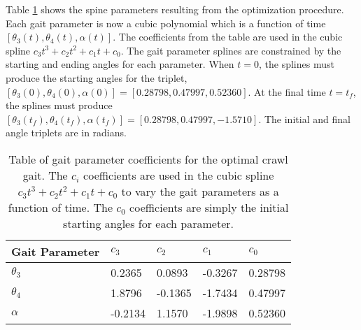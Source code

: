 


Table \ref{tab:optimal_parameters} shows the spine parameters resulting from the
optimization procedure. 
Each gait parameter is now a cubic polynomial which is a function of time 
$[\theta_3 (t), \theta_4 (t), \alpha (t)]$.
The coefficients from the table are used in the cubic spline $c_3 t^3 + c_2 t^2 + c_1 t + c_0$.
The gait parameter splines are constrained by the starting and ending angles for each parameter.
When $t = 0$, the splines must produce the starting angles for the triplet, 
$[\theta_3 (0), \theta_4 (0), \alpha (0)] = [0.28798, 0.47997, 0.52360]$.
At the final time $t = t_f$, the splines must produce 
$[\theta_3 (t_f), \theta_4 (t_f), \alpha (t_f)] = [0.28798, 0.47997, -1.5710]$. 
The initial and final angle triplets are in radians.

\begin{table}
  \centering
  \begin{tabularx}{0.75\textwidth}{|l|l|l|l|X|}
    \hline
    \textbf{Gait Parameter} & \textbf{$c_3$} & \textbf{$c_2$} & \textbf{$c_1$} & \textbf{$c_0$} \\  \hline\hline
    $\theta_3$              &   0.2365       &  0.0893        & -0.3267        &  0.28798       \\ 
    $\theta_4$              &   1.8796       & -0.1365        & -1.7434        &  0.47997       \\  
    $\alpha$                &  -0.2134       &  1.1570        & -1.9898        &  0.52360       \\  \hline
  \end{tabularx} 
  
  \caption{Table of gait parameter coefficients for the optimal crawl gait. 
           The $c_i$ coefficients are used in the cubic spline 
           $c_3 t^3 + c_2 t^2 + c_1 t + c_0$ to vary the gait parameters as a function of time.
           The $c_0$ coefficients are simply the initial starting angles for each parameter.}
  \label{tab:optimal_parameters}
\end{table}

